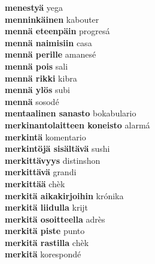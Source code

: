 \textbf{ menestyä  } yega \\
\textbf{ menninkäinen  } kabouter \\
\textbf{ mennä eteenpäin  } progresá \\
\textbf{ mennä naimisiin  } casa \\
\textbf{ mennä perille  } amanesé \\
\textbf{ mennä pois  } sali \\
\textbf{ mennä rikki  } kibra \\
\textbf{ mennä ylös  } subi \\
\textbf{ mennä  } sosodé \\
\textbf{ mentaalinen sanasto  } bokabulario \\
\textbf{ merkinantolaitteen koneisto  } alarmá \\
\textbf{ merkintä  } komentario \\
\textbf{ merkintöjä sisältävä  } sushi \\
\textbf{ merkittävyys  } distinshon \\
\textbf{ merkittävä  } grandi \\
\textbf{ merkittää  } chèk \\
\textbf{ merkitä aikakirjoihin  } krónika \\
\textbf{ merkitä liidulla  } krijt \\
\textbf{ merkitä osoitteella  } adrès \\
\textbf{ merkitä piste  } punto \\
\textbf{ merkitä rastilla  } chèk \\
\textbf{ merkitä  } korespondé \\
